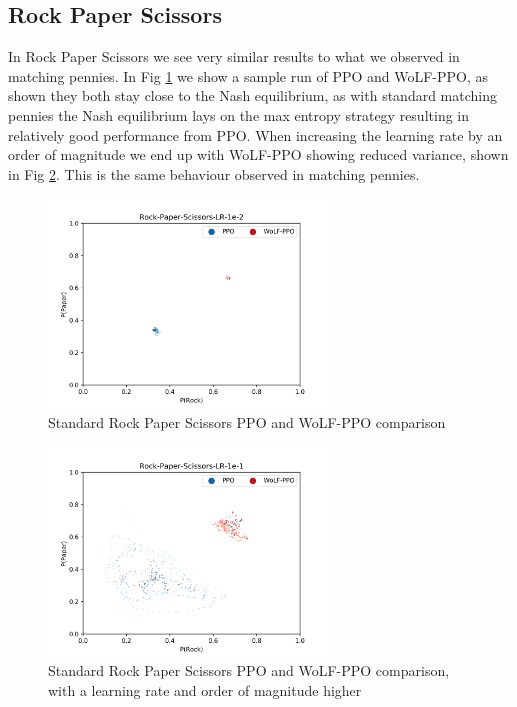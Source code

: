 \documentclass[conference]{IEEEtran}
\begin{document}
\subsection{Rock Paper Scissors}

In Rock Paper Scissors we see very similar results to what we observed in matching pennies. In Fig \ref{fig:rps-ppo-e2} we show a sample run of PPO and WoLF-PPO, as shown they both stay close to the Nash equilibrium, as with standard matching pennies the Nash equilibrium lays on the max entropy strategy resulting in relatively good performance from PPO. When increasing the learning rate by an order of magnitude we end up with WoLF-PPO showing reduced variance, shown in Fig \ref{fig:rps-ppo-e1}. This is the same behaviour observed in matching pennies.

\begin{figure}
    \centering
    \includegraphics[width=20em]{Figures/rock-paper-scissors-lr-1e-2}
    \caption{Standard Rock Paper Scissors PPO and WoLF-PPO comparison}
    \label{fig:rps-ppo-e2}
\end{figure}

\begin{figure}
    \centering
    \includegraphics[width=20em]{Figures/rock-paper-scissors-lr-1e-1}
    \caption{Standard Rock Paper Scissors PPO and WoLF-PPO comparison, with a learning rate and order of magnitude higher}
    \label{fig:rps-ppo-e1}
\end{figure}
\end{document}
